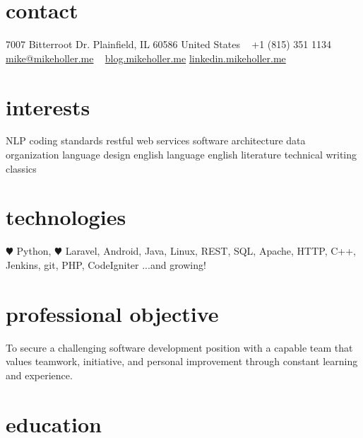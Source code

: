 \documentclass[]{friggeri-cv} %
\begin{document}


\begin{aside} %
\section{contact}
7007 Bitterroot Dr.
Plainfield, IL 60586
United States
~
+1 (815) 351 1134
~
\href{mailto:mike@mikeholler.me}{mike@mikeholler.me}
~
\href{http://blog.mikeholler.me}{blog.mikeholler.me}
\href{http://linkedin.mikeholler.me}{linkedin.mikeholler.me}
\section{interests}
NLP
coding standards
restful web services
software architecture
data organization
language design
english language
english literature
technical writing
classics
\section{technologies}
{\color{red} $\varheartsuit$} Python, {\color{red} $\varheartsuit$} Laravel,
Android, Java, Linux,
REST, SQL, Apache,
HTTP, C++, Jenkins,
git, PHP, CodeIgniter
...and growing!
\end{aside}

\section{professional objective}
To secure a challenging software development position with a capable team that values
teamwork, initiative, and personal improvement through constant learning and experience.


\section{education}
\end{document}
